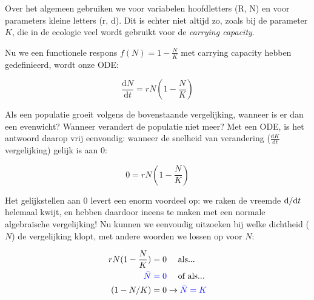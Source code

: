 \documentclass[
  a4paper,
]{scrbook}
\theoremstyle{definition}
\theoremstyle{remark}
\begin{document}
\begin{tcolorbox}[enhanced jigsaw, rightrule=.15mm, opacityback=0, leftrule=.75mm, title=\textcolor{quarto-callout-warning-color}{\faExclamationTriangle}\hspace{0.5em}{Parameters zijn vaak kleine letters, maar niet altijd}, toptitle=1mm, titlerule=0mm, opacitybacktitle=0.6, colframe=quarto-callout-warning-color-frame, breakable, colbacktitle=quarto-callout-warning-color!10!white, coltitle=black, toprule=.15mm, bottomrule=.15mm, left=2mm, bottomtitle=1mm, arc=.35mm, colback=white]

Over het algemeen gebruiken we voor variabelen hoofdletters (R, N) en
voor parameters kleine letters (r, d). Dit is echter niet altijd zo,
zoals bij de parameter \(K\), die in de ecologie veel wordt gebruikt
voor de \emph{carrying capacity}.

\end{tcolorbox}

Nu we een functionele respons \(f(N) = 1-\frac{N}{K}\) met carrying
capacity hebben gedefinieerd, wordt onze ODE:

\begin{equation}
    \frac{\mathrm{d}N}{\mathrm{d}t} = rN (1-\frac{N}{K})
\end{equation}

Als een populatie groeit volgens de bovenstaande vergelijking, wanneer
is er dan een evenwicht? Wanneer verandert de populatie niet meer? Met
een ODE, is het antwoord daarop vrij eenvoudig: wanneer de snelheid van
verandering (\(\frac{\mathrm{d}K}{\mathrm{d}t}\) vergelijking) gelijk is
aan 0:

\begin{equation}
    0 = rN (1-\frac{N}{K})
\end{equation}

Het gelijkstellen aan \(0\) levert een enorm voordeel op: we raken de
vreemde \(\mathchoice{\frac{\mathrm{d} }
{\mathrm{d}t}}{\mathrm{d} /\mathrm{d}t}
{\mathrm{d} /\mathrm{d}t}
{\mathrm{d} /\mathrm{d}t}\) helemaal kwijt, en hebben daardoor ineens te
maken met een normale algebraïsche vergelijking! Nu kunnen we eenvoudig
uitzoeken bij welke dichtheid (\(N\)) de vergelijking klopt, met andere
woorden we lossen op voor \(N\):

\begin{align*}
    rN (1-\frac{N}{K}) &= 0 \quad \text{ als...}\\
    \color{blue} \bar{N} & \color{blue} = 0  \color{black} \quad \text{ of als...}\\
    (1-N/K) &= 0 \rightarrow \color{blue} \bar{N}=K \\
\end{align*}
\end{document}
